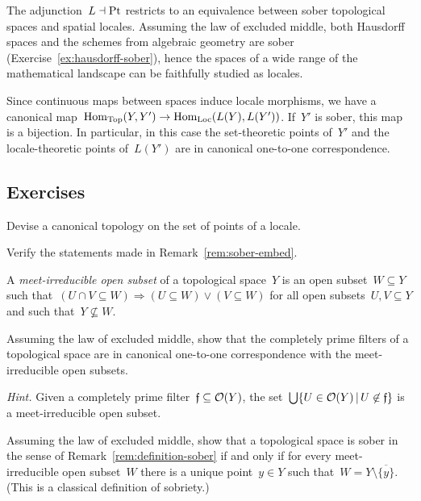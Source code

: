 \documentclass{ws-rv9x6}
\begin{document}
{\begin{remark}
The adjunction~$L \dashv \mathrm{Pt}$ restricts to an equivalence between sober
topological spaces and spatial locales. Assuming the law of excluded middle,
both Hausdorff spaces and the schemes from algebraic geometry are sober
(Exercise~\ref{ex:hausdorff-sober}), hence the spaces of a wide
range of the mathematical landscape can be faithfully studied as locales.\end{remark}

\begin{remark}\label{rem:sober-embed}
Since continuous maps between spaces induce locale morphisms, we
have a canonical map~$\mathrm{Hom}_{\mathrm{Top}}(Y,Y') \to \mathrm{Hom}_{\mathrm{Loc}}(L(Y),L(Y'))$. If~$Y'$ is
sober, this map is a bijection. In particular, in this case the set-theoretic points
of~$Y'$ and the locale-theoretic points of~$L(Y')$ are in canonical
one-to-one correspondence.
\end{remark}


\subsection*{Exercises}

\begin{exercise}%
\label{ex:canonical-topology}%
Devise a canonical to\-po\-logy on the set of points of a locale.
\end{exercise}

\begin{exercise}%
Verify the statements made in Remark~\ref{rem:sober-embed}.
\end{exercise}

\begin{exercise}%
\label{ex:hausdorff-sober}%
A \emph{meet-irreducible open subset} of a topological space~$Y$ is an
open subset~$W \subseteq Y$ such that~$(U \cap V \subseteq W) \Rightarrow (U
\subseteq W) \vee (V \subseteq W)$ for all open subsets~$U,V \subseteq Y$ and
such that~$Y \not\subseteq W$.
\begin{alphlist}[(c)]
\item Assuming the law of excluded middle, show that the completely prime
filters of a topological space are in canonical one-to-one correspondence with
the meet-irreducible open subsets.\smallskip

{\scriptsize\emph{Hint.} Given a completely prime filter~$\mathfrak{f} \subseteq
\mathcal{O}(Y)$, the set~$\bigcup\{ U \in \mathcal{O}(Y) \,|\, U \not\in \mathfrak{f} \}$ is a
meet-irreducible open subset.\par}
\item Assuming the law of excluded middle, show that a topological space is
sober in the sense of Remark~\ref{rem:definition-sober} if and only if for
every meet-irreducible open subset~$W$ there is a unique point~$y \in Y$ such
that~$W = Y \setminus \overline{\{y\}}$.
(This is a classical definition of sobriety.)


\end{alphlist}
\end{exercise}}
\end{document}

